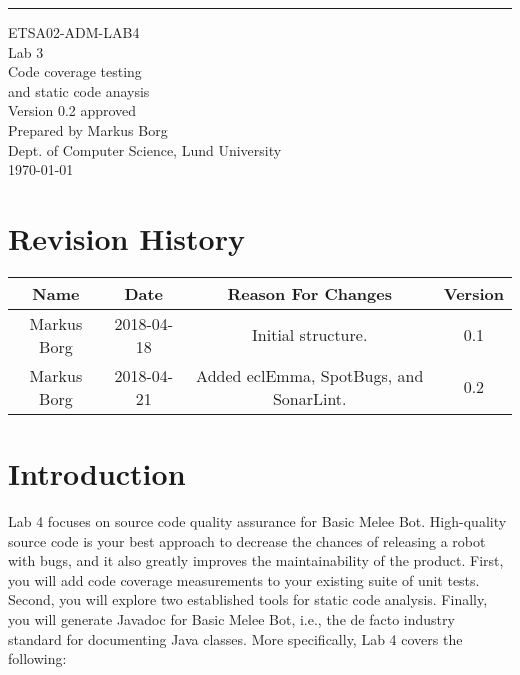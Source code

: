 \documentclass{scrreprt}
\date{}
\def\myversion{0.2 }
\begin{document}
\begin{flushright}
    \rule{16cm}{5pt}\vskip1cm
    \begin{bfseries}
    	\LARGE{ETSA02-ADM-LAB4}\\
    	\vspace{1.5cm}
        \Huge{Lab 3}\\
        \vspace{0.5cm}
        Code coverage testing\\
        \vspace{0.5cm}
        and static code anaysis\\
        \vspace{1.5cm}
        \LARGE{Version \myversion approved}\\
        \vspace{1.5cm}
        Prepared by Markus Borg\\
        Dept. of Computer Science, Lund University\\
        \vspace{1.5cm}
        \today\\
    \end{bfseries}
\end{flushright}


\chapter*{Revision History}

\begin{center}
    \begin{tabular}{|c|c|c|c|}
        \hline
	    Name & Date & Reason For Changes & Version\\
        \hline
	    Markus Borg & 2018-04-18 & Initial structure. & 0.1\\
        \hline
        Markus Borg & 2018-04-21 & Added eclEmma, SpotBugs, and SonarLint. & 0.2\\
        \hline
    \end{tabular}
\end{center}

\chapter{Introduction}
Lab 4 focuses on source code quality assurance for Basic Melee Bot. High-quality source code is your best approach to decrease the chances of releasing a robot with bugs, and it also greatly improves the maintainability of the product. First, you will add code coverage measurements to your existing suite of unit tests. Second, you will explore two established tools for static code analysis. Finally, you will generate Javadoc for Basic Melee Bot, i.e., the de facto industry standard for documenting Java classes. More specifically, Lab 4 covers the following:
\end{document}
